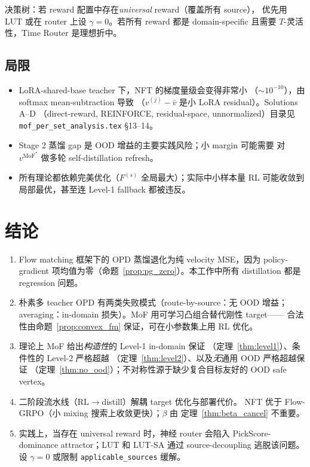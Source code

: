 \documentclass[11pt,a4paper]{article}
\newcommand{\MoF}{\mathrm{MoF}}
\theoremstyle{definition}
\begin{document}
决策树：若 reward 配置中存在\emph{universal} reward（覆盖所有 source），
优先用 LUT 或在 router 上设 $\gamma = 0$。若所有 reward 都是
domain-specific 且需要 $T$-灵活性，Time Router 是理想折中。

\subsection{局限}
\begin{itemize}[leftmargin=1.5em]
\item LoRA-shared-base teacher 下，NFT 的梯度量级会变得非常小
（$\sim 10^{-10}$），由 softmax mean-subtraction 导致
（$v^{(j)} - \bar v$ 是小 LoRA residual）。Solutions A--D
（direct-reward, REINFORCE, residual-space, unnormalized）目录见
\texttt{mof\_per\_set\_analysis.tex} \S13--14。
\item Stage 2 蒸馏 gap 是 OOD 增益的主要实践风险；小 margin 可能需要
对 $v^{\MoF^*}$ 做多轮 self-distillation refresh。
\item 所有理论都依赖完美优化（$F^{(s)}$ 全局最大）；实际中小样本量
RL 可能收敛到局部最优，甚至连 Level-1 fallback 都被违反。
\end{itemize}

\section{结论}
\label{sec:conclusion}

\begin{tcolorbox}[colback=yellow!5,colframe=yellow!60!black,title=核心结论]
\begin{enumerate}[leftmargin=1.5em]
\item Flow matching 框架下的 OPD 蒸馏退化为纯 velocity MSE，因为
policy-gradient 项均值为零（命题~\ref{prop:pg_zero}）。本工作中所有
distillation 都是 regression 问题。
\item 朴素多 teacher OPD 有两类失败模式（route-by-source：无 OOD 增益；
averaging：in-domain 损失）。MoF 用可学习凸组合替代刚性 target——
合法性由命题~\ref{prop:convex_fm} 保证，可在小参数集上用 RL 优化。
\item 理论上 MoF 给出\emph{构造性}的 Level-1 in-domain 保证
（定理~\ref{thm:level1}）、条件性的 Level-2 严格超越
（定理~\ref{thm:level2}）、以及\emph{无}通用 OOD 严格超越保证
（定理~\ref{thm:no_ood}）；不对称性源于缺少复合目标友好的 OOD safe
vertex。
\item 二阶段流水线（RL$\to$distill）解耦 target 优化与部署代价。
NFT 优于 Flow-GRPO（小 mixing 搜索上收敛更快）；$\beta$ 由
定理~\ref{thm:beta_cancel} 不重要。
\item 实践上，当存在 universal reward 时，神经 router 会陷入
PickScore-dominance attractor；LUT 和 LUT-SA 通过 source-decoupling
逃脱该问题。设 $\gamma = 0$ 或限制 \texttt{applicable\_sources} 缓解。
\end{enumerate}
\end{tcolorbox}
\end{document}
